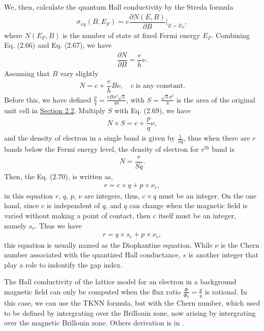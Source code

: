\documentclass{report}
\newcommand{\f}[2]{\dfrac{#1}{#2}}
\newcommand{\at}[2]{\bigg\rvert_{#1}^{#2} }
\begin{document}

We, then, calculate the quantum Hall conductivity by the Streda formula \cite{streda1982}
\begin{gather}
	\sigma_{xy}(B,E_{F}) = e \f{\partial N (E,B)}{\partial B} \at{E=E_{F}}{},
\end{gather}
where $N(E_{F},B)$ is the number of state at fixed Fermi energy $E_{F}$. Combining Eq. (2.66) and Eq. (2.67), we have
\begin{gather}
	\f{\partial N}{\partial B} = \f{e}{h} \nu.
\end{gather}
Assuming that $B$ vary slightly
\begin{gather}
	N = c + \f{e}{h}B \nu, \quad c \; \text{is any constant}.
\end{gather}
Before this, we have defined $\frac{p}{q} = \frac{eBa^{2}\sqrt{3}}{4h}$, with $S = \frac{\sqrt{3} a^{2}}{4}$ is the area of the original unit cell in \hyperref[Section 2.2]{Section 2.2}. Multiply $S$ with Eq. (2.69), we have
\begin{gather}
	N \times S = c + \f{p}{q} \nu,
\end{gather}
and the density of electron in a single band is given by $\frac{1}{Sq}$, thus when there are $r$ bands below the Fermi energy level, the density of electron for $r^{\text{th}}$ band is
\begin{gather}
	N = \f{r}{Sq}.
\end{gather}
Then, the Eq. (2.70), is written as,
\begin{gather}
	r = c \times q + p \times \nu_{r},
\end{gather}
in this equation $r$, $q$, $p$, $\nu$ are integers, thus, $c\times q$ must be an integer. On the one hand, since $c$ is independent of $q$, and $q$ can change when the magnetic field is varied without making a point of contact, then $c$ itself must be an integer, namely $s_{r}$. Thus we have
\begin{gather}
	r = q \times s_{r} + p \times \nu_{r},
\end{gather}
this equation is usually named as the Diophantine equation. While $\nu$ is the Chern number associated with the quantized Hall conductance, $s$ is another integer that play a role to indentify the gap index.

The Hall conductivity of the lattice model for an electron in a background magnetic field can only be computed when the flux ratio $\frac{\Phi}{\Phi_{0}} = \frac{p}{q}$ is rational. In this case, we can use the TKNN formula, but with the Chern number, which used to be defined by intergrating over the Brillouin zone, now arising by intergrating over the magnetic Brillouin zone. Others derivation is in \cite{di2022linking,dana1985,avron2003}.
\end{document}
